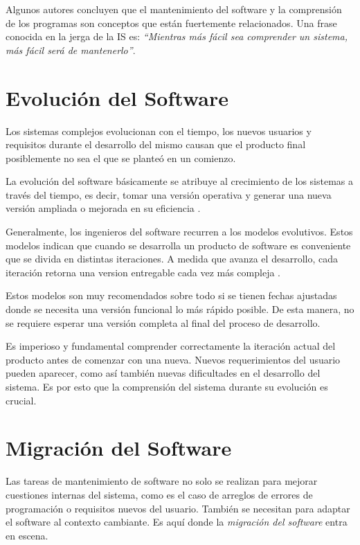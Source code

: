 \documentclass[a4paper,12pt]{report}
\begin{document}
Algunos autores \cite{KBVR00,MAS05,RSPMGH02,PFT02} concluyen que el mantenimiento del software y la comprensión de los programas son conceptos que están fuertemente relacionados. Una frase conocida en la jerga de la IS es: \textit{“Mientras más fácil sea comprender un sistema, más fácil será de mantenerlo”}.


\section{Evolución del Software}

Los sistemas complejos evolucionan con el tiempo, los nuevos usuarios y requisitos durante el desarrollo del mismo causan que el producto final posiblemente no sea el que se planteó en un comienzo. 

La evolución del software básicamente se atribuye al crecimiento de los sistemas a través del tiempo, es decir, tomar una versión operativa y generar una nueva versión ampliada o mejorada en su eficiencia \cite{KBVR00}.

Generalmente, los ingenieros del software recurren a los modelos evolutivos. Estos modelos indican que cuando se desarrolla un producto de software es conveniente que se divida en distintas iteraciones. A medida que avanza el desarrollo, cada iteración retorna una version entregable cada vez más compleja \cite{RSPMGH02}. 

Estos modelos son muy recomendados sobre todo si se tienen fechas ajustadas donde se necesita una versión funcional lo más rápido posible. De esta manera, no se requiere esperar una versión completa al final del proceso de desarrollo.

Es imperioso y fundamental comprender correctamente la iteración actual del producto antes de comenzar con una nueva. Nuevos requerimientos del usuario pueden aparecer, como así también nuevas dificultades en el desarrollo del sistema. Es por esto que la comprensión del sistema durante su evolución es crucial.



\section{Migración del Software}

Las tareas de mantenimiento de software no solo se realizan para mejorar cuestiones internas del sistema, como es el caso de arreglos de errores de programación o requisitos nuevos del usuario. También se necesitan para adaptar el software al contexto cambiante. Es aquí donde la \textit{migración del software} entra en escena.
 
\end{document}
